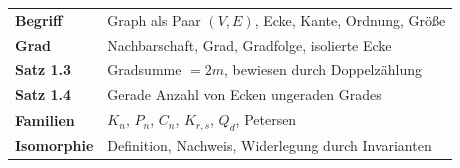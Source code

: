 \begin{merksatz}
\begin{center}
\renewcommand{\arraystretch}{1.5}
\begin{tabular}{@{}P{3.2cm}P{5.4cm}@{}}
\toprule
\textbf{Begriff} & Graph als Paar $(V,E)$, Ecke, Kante, Ordnung, Größe\\
\textbf{Grad} & Nachbarschaft, Grad, Gradfolge, isolierte Ecke\\
\textbf{Satz 1.3} & Gradsumme $= 2m$, bewiesen durch Doppelzählung\\
\textbf{Satz 1.4} & Gerade Anzahl von Ecken ungeraden Grades\\
\textbf{Familien} & $K_n$, $P_n$, $C_n$, $K_{r,s}$, $Q_d$, Petersen\\
\textbf{Isomorphie} & Definition, Nachweis, Widerlegung durch Invarianten\\
\bottomrule
\end{tabular}
\end{center}

\begin{center}
\begin{minipage}{0.88\textwidth}
\end{minipage}
\end{center}
\end{merksatz}
